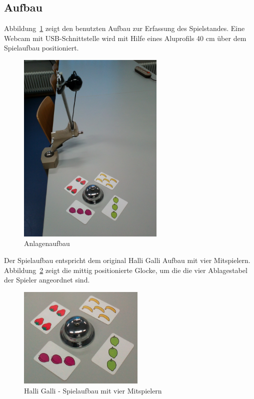 \subsection{Aufbau}
\label{sub:Aufbau}

Abbildung~\ref{fig:Anlage} zeigt den benutzten Aufbau zur Erfassung des Spielstandes. Eine Webcam mit USB-Schnittstelle wird mit Hilfe eines Aluprofils 40 cm über dem Spielaufbau positioniert.

\begin{figure}[]
    \centering
    \includegraphics[width=7cm]{Abbildungen/KameraAufbau}
    \caption[Anlage]{Anlagenaufbau}
    \label{fig:Anlage}
\end{figure}

Der Spielaufbau entspricht dem original Halli Galli Aufbau mit vier Mitspielern. Abbildung~\ref{fig:Spielaufbau} zeigt die mittig positionierte Glocke, um die die vier Ablagestabel der Spieler angeordnet sind.

\begin{figure}[h]
    \centering
    \includegraphics[width=6cm]{Abbildungen/Aufbau4}
    \caption[Spielaufbau]{Halli Galli - Spielaufbau mit vier Mitspielern}
    \label{fig:Spielaufbau}
\end{figure}


